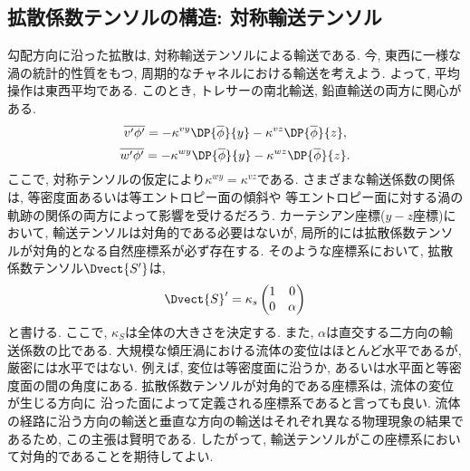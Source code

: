 \subsection{拡散係数テンソルの構造: 対称輸送テンソル}
勾配方向に沿った拡散は, 対称輸送テンソルによる輸送である. 
今, 東西に一様な渦の統計的性質をもつ, 周期的なチャネルにおける輸送を考えよう. 
よって, 平均操作は東西平均である. 
このとき, トレサーの南北輸送, 鉛直輸送の両方に関心がある. 
\begin{equation}
  \overline{v' \phi'} = - \kappa^{vy} \DP{\overline{\phi}}{y}
                        - \kappa^{vz} \DP{\overline{\phi}}{z}, 
\end{equation}
\begin{equation}
  \overline{w' \phi'} = - \kappa^{wy} \DP{\overline{\phi}}{y}
                        - \kappa^{wz} \DP{\overline{\phi}}{z}. 
\end{equation}
ここで, 対称テンソルの仮定により$\kappa^{wy} = \kappa^{vz}$である. 
さまざまな輸送係数の関係は, 等密度面あるいは等エントロピー面の傾斜や
等エントロピー面に対する渦の軌跡の関係の両方によって影響を受けるだろう. 
カーテシアン座標($y-z$座標)において, 輸送テンソルは対角的である必要はないが, 
局所的には拡散係数テンソルが対角的となる自然座標系が必ず存在する. 
そのような座標系において, 拡散係数テンソル$\Dvect{S'}$は, 
\begin{equation}
  \Dvect{S}' = \kappa_s
\begin{pmatrix}
    1 &0  \\
    0 &\alpha
  \end{pmatrix}
\end{equation}
と書ける. 
ここで, $\kappa_S$は全体の大きさを決定する. 
また, $\alpha$は直交する二方向の輸送係数の比である. 
大規模な傾圧渦における流体の変位はほとんど水平であるが, 厳密には水平ではない. 
例えば, 変位は等密度面に沿うか, あるいは水平面と等密度面の間の角度にある. 
拡散係数テンソルが対角的である座標系は, 流体の変位が生じる方向に
沿った面によって定義される座標系であると言っても良い. 
流体の経路に沿う方向の輸送と垂直な方向の輸送はそれぞれ異なる物理現象の結果であるため, 
この主張は賢明である. 
したがって, 輸送テンソルがこの座標系において対角的であることを期待してよい. 

